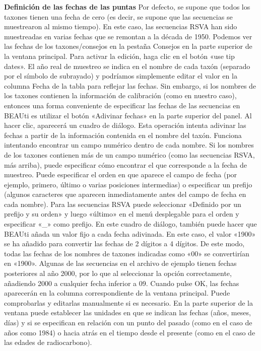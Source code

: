 \textbf{Definición de las fechas de las puntas}
Por defecto, se supone que todos los taxones tienen una fecha de cero (es decir, se supone que las secuencias se muestrearon al mismo tiempo). En este caso, las secuencias RSVA han sido muestreadas en varias fechas que se remontan a la década de 1950. Podemos ver las fechas de los taxones/consejos en la pestaña Consejos en la parte superior de la ventana principal. Para activar la edición, haga clic en el botón «use tip dates». El año real de muestreo se indica en el nombre de cada taxón (separado por el símbolo de subrayado) y podríamos simplemente editar el valor en la columna Fecha de la tabla para reflejar las fechas. Sin embargo, si los nombres de los taxones contienen la información de calibración (como en nuestro caso), entonces una forma conveniente de especificar las fechas de las secuencias en BEAUti es utilizar el botón «Adivinar fechas» en la parte superior del panel. Al hacer clic, aparecerá un cuadro de diálogo. Esta operación intenta adivinar las fechas a partir de la información contenida en el nombre del taxón. Funciona intentando encontrar un campo numérico dentro de cada nombre. Si los nombres de los taxones contienen más de un campo numérico (como las secuencias RSVA, más arriba), puede especificar cómo encontrar el que corresponde a la fecha de muestreo. Puede especificar el orden en que aparece el campo de fecha (por ejemplo, primero, último o varias posiciones intermedias) o especificar un prefijo (algunos caracteres que aparecen inmediatamente antes del campo de fecha en cada nombre). Para las secuencias RSVA puede seleccionar «Definido por un prefijo y su orden» y luego «último» en el menú desplegable para el orden y especificar «\_» como prefijo. En este cuadro de diálogo, también puede hacer que BEAUti añada un valor fijo a cada fecha adivinada. En este caso, el valor «1900» se ha añadido para convertir las fechas de 2 dígitos a 4 dígitos. De este modo, todas las fechas de los nombres de taxones indicadas como «00» se convertirían en «1900». Algunas de las secuencias en el archivo de ejemplo tienen fechas posteriores al año 2000, por lo que al seleccionar la opción correctamente, añadiendo 2000 a cualquier fecha inferior a 09. Cuando pulse OK, las fechas aparecerán en la columna correspondiente de la ventana principal. Puede comprobarlas y editarlas manualmente si es necesario. En la parte superior de la ventana puede establecer las unidades en que se indican las fechas (años, meses, días) y si se especifican en relación con un punto del pasado (como en el caso de años como 1984) o hacia atrás en el tiempo desde el presente (como en el caso de las edades de radiocarbono).

